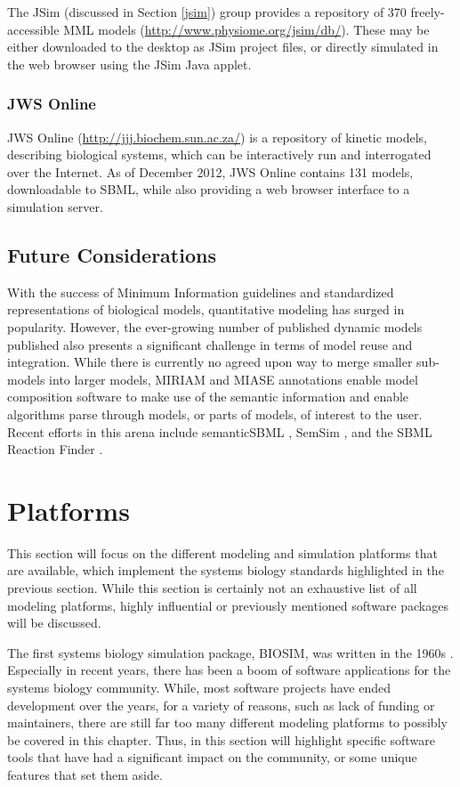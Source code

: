 \documentclass[]{article}
\begin{document}
The JSim (discussed in Section \ref{jsim}) group provides a repository
of 370 freely-accessible MML models
(\url{http://www.physiome.org/jsim/db/}). These may be either downloaded
to the desktop as JSim project files, or directly simulated in the web
browser using the JSim Java applet.

\subsubsection{JWS Online}

JWS Online (\url{http://jjj.biochem.sun.ac.za/})
\autocite{olivier2004web} is a repository of kinetic models, describing
biological systems, which can be interactively run and interrogated over
the Internet. As of December 2012, JWS Online contains 131 models,
downloadable to SBML, while also providing a web browser interface to a
simulation server.

\subsection{Future Considerations}

With the success of Minimum Information guidelines and standardized
representations of biological models, quantitative modeling has surged
in popularity. However, the ever-growing number of published dynamic
models published also presents a significant challenge in terms of model
reuse and integration. While there is currently no agreed upon way to
merge smaller sub- models into larger models, MIRIAM and MIASE
annotations enable model composition software to make use of the
semantic information and enable algorithms parse through models, or
parts of models, of interest to the user. Recent efforts in this arena
include semanticSBML \autocite{krause2010annotation}, SemSim
\autocite{neal2009advances}, and the SBML Reaction Finder
\autocite{neal2012sbml}.

\section{Platforms}

This section will focus on the different modeling and simulation
platforms that are available, which implement the systems biology
standards highlighted in the previous section. While this section is
certainly not an exhaustive list of all modeling platforms, highly
influential or previously mentioned software packages will be discussed.

The first systems biology simulation package, BIOSIM, was written in the
1960s \autocite{Ga68}. Especially in recent years, there has been a boom
of software applications for the systems biology community. While, most
software projects have ended development over the years, for a variety
of reasons, such as lack of funding or maintainers, there are still far
too many different modeling platforms to possibly be covered in this
chapter. Thus, in this section will highlight specific software tools
that have had a significant impact on the community, or some unique
features that set them aside.
\end{document}
